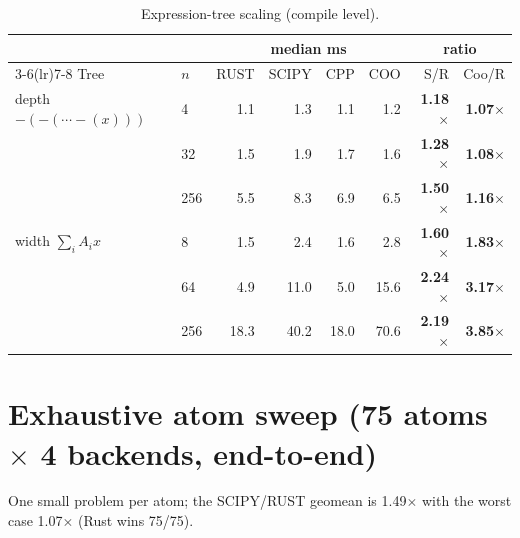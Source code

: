 \documentclass[11pt]{article}
\begin{document}
\begin{table}[h]\centering\small
\begin{tabular}{llrrrrrr}
\toprule
 & & \multicolumn{4}{c}{median ms} & \multicolumn{2}{c}{ratio} \\
\cmidrule(lr){3-6}\cmidrule(lr){7-8}
Tree & $n$ & RUST & SCIPY & CPP & COO & S/R & Coo/R \\
\midrule
depth $-(-(\cdots-(x)))$ & 4 & 1.1 & 1.3 & 1.1 & 1.2 & \textbf{1.18$\times$} & \textbf{1.07$\times$} \\
 & 32 & 1.5 & 1.9 & 1.7 & 1.6 & \textbf{1.28$\times$} & \textbf{1.08$\times$} \\
 & 256 & 5.5 & 8.3 & 6.9 & 6.5 & \textbf{1.50$\times$} & \textbf{1.16$\times$} \\
width $\sum_i A_i x$ & 8 & 1.5 & 2.4 & 1.6 & 2.8 & \textbf{1.60$\times$} & \textbf{1.83$\times$} \\
 & 64 & 4.9 & 11.0 & 5.0 & 15.6 & \textbf{2.24$\times$} & \textbf{3.17$\times$} \\
 & 256 & 18.3 & 40.2 & 18.0 & 70.6 & \textbf{2.19$\times$} & \textbf{3.85$\times$} \\
\bottomrule
\end{tabular}
\caption*{Expression-tree scaling (compile level).}
\end{table}

\clearpage
\section{Exhaustive atom sweep (75 atoms $\times$ 4 backends, end-to-end)}
One small problem per atom; the SCIPY/RUST geomean is
1.49$\times$ with the worst case 1.07$\times$ (Rust wins 75/75).
\end{document}
